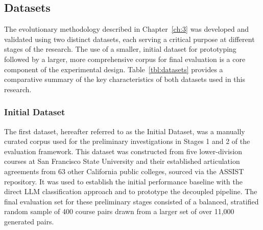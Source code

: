 \subsection{Datasets}
The evolutionary methodology described in Chapter~\ref{ch:3} was developed and validated using two distinct datasets, each serving a critical purpose at different stages of the research. The use of a smaller, initial dataset for prototyping followed by a larger, more comprehensive corpus for final evaluation is a core component of the experimental design. Table~\ref{tbl:datasets} provides a comparative summary of the key characteristics of both datasets used in this research.
\begin{table}[!htb]
    \centering
    \caption{Summary of Datasets Used in Evaluation}
    \label{tbl:datasets}
\end{table}

\subsubsection{Initial Dataset}
The first dataset, hereafter referred to as the Initial Dataset, was a manually curated corpus used for the preliminary investigations in Stages 1 and 2 of the evaluation framework. This dataset was constructed from five lower-division courses at San Francisco State University and their established articulation agreements from 63 other California public colleges, sourced via the ASSIST repository. It was used to establish the initial performance baseline with the direct LLM classification approach and to prototype the decoupled pipeline. The final evaluation set for these preliminary stages consisted of a balanced, stratified random sample of 400 course pairs drawn from a larger set of over 11,000 generated pairs.

